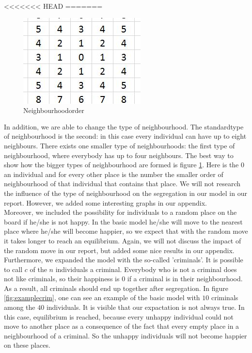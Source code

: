 <<<<<<< HEAD
=======

\begin{figure}
\vspace{-20pt}
\centering
\includegraphics[scale=0.5]{buurtorde.jpg}
\caption{Neighbourhoodorder}
\vspace{-15pt}
\label{fig:neighbourhood}
\end{figure}

In addition, we are able to change the type of neighbourhood.
The standardtype of neighbourhood is the second: in this case every individual can have up to eight neighbours.
There exists one smaller type of neighbourhoods: the first type of neighbourhood, where everybody has up to four neighbours.
The best way to show how the bigger types of neighbourhood are formed is figure \ref{fig:neighbourhood}.
Here is the $0$ an individual and for every other place is the number the smaller order of neighbourhood of that individual that contains that place.
We will not research the influence of the type of neighbourhood on the segregation in our model in our report.
However, we added some interesting graphs in our appendix.\\

Moreover, we included the possibility for individuals to a random place on the board if he/she is not happy.
In the basic model he/she will move to the nearest place where he/she will become happier, so we expect that with the random move it takes longer to reach an equilibrium.
Again, we will not discuss the impact of the random move in our report, but added some nice results in our appendix.\\

Furthermore, we expanded the model with the so-called 'criminals'.
It is possible to call $c$ of the $n$ individuals a criminal.
Everybody who is not a criminal does not like criminals, so their happiness is $0$ if a criminal is in their neighbourhood.
As a result, all criminals should end up together after segregation.
In figure \ref{fig:examplecrim}, one can see an example of the basic model with $10$ criminals among the $40$ individuals.
It is visible that our expactation is not always true.
In this case, equilibrium is reached, because every unhappy individual could not move to another place as a consequence of the fact that every empty place in a neighbourhood of a criminal.
So the unhappy individuals will not become happier on these places.

